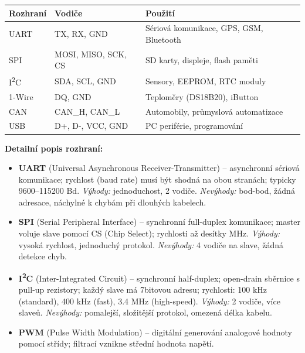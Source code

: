 \documentclass[a4paper,10pt]{article}
\begin{document}
\begin{vysvetlenibox}
\begin{center}
\begin{tabularx}{0.95\linewidth}{@{} l l X @{}}
    \toprule
    \textbf{Rozhraní} & \textbf{Vodiče} & \textbf{Použití} \\
    \midrule
    UART & TX, RX, GND & Sériová komunikace, GPS, GSM, Bluetooth \\
    SPI & MOSI, MISO, SCK, CS & SD karty, displeje, flash paměti \\
    I\textsuperscript{2}C & SDA, SCL, GND & Sensory, EEPROM, RTC moduly \\
    1-Wire & DQ, GND & Teploměry (DS18B20), iButton \\
    CAN & CAN\_H, CAN\_L & Automobily, průmyslová automatizace \\
    USB & D+, D-, VCC, GND & PC periférie, programování \\
    \bottomrule
\end{tabularx}
\end{center}

\textbf{Detailní popis rozhraní:}
\begin{itemize}[noitemsep, leftmargin=1.4em, topsep=4pt]
    \item \textbf{UART} (Universal Asynchronous Receiver-Transmitter) --
          asynchronní sériová komunikace; rychlost (baud rate) musí být
          shodná na obou stranách; typicky 9600--115200 Bd.
          \textit{Výhody:} jednoduchost, 2 vodiče. \textit{Nevýhody:} bod-bod,
          žádná adresace, náchylné k chybám při dlouhých kabelech.

    \item \textbf{SPI} (Serial Peripheral Interface) --
          synchronní full-duplex komunikace; master voluje slave pomocí CS
          (Chip Select); rychlosti až desítky MHz.
          \textit{Výhody:} vysoká rychlost, jednoduchý protokol.
          \textit{Nevýhody:} 4 vodiče na slave, žádná detekce chyb.

    \item \textbf{I\textsuperscript{2}C} (Inter-Integrated Circuit) --
          synchronní half-duplex; open-drain sběrnice s pull-up rezistory;
          každý slave má 7bitovou adresu; rychlosti: 100 kHz (standard),
          400 kHz (fast), 3.4 MHz (high-speed).
          \textit{Výhody:} 2 vodiče, více slaveů. \textit{Nevýhody:} pomalejší,
          složitější protokol, omezená délka kabelu.

    \item \textbf{PWM} (Pulse Width Modulation) --
          digitální generování analogové hodnoty pomocí střídy;
          filtrací vznikne střední hodnota napětí.
\end{itemize}


\end{vysvetlenibox}
\end{document}
